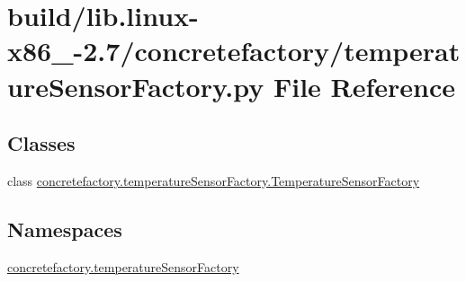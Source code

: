 \hypertarget{build_2lib_8linux-x86__64-2_87_2concretefactory_2temperatureSensorFactory_8py}{}\section{build/lib.linux-\/x86\+\_-\/2.7/concretefactory/temperature\+Sensor\+Factory.py File Reference}
\label{build_2lib_8linux-x86__64-2_87_2concretefactory_2temperatureSensorFactory_8py}
\subsection*{Classes}
\begin{DoxyCompactItemize}
\item 
class \hyperlink{classconcretefactory_1_1temperatureSensorFactory_1_1TemperatureSensorFactory}{concretefactory.\+temperature\+Sensor\+Factory.\+Temperature\+Sensor\+Factory}
\end{DoxyCompactItemize}
\subsection*{Namespaces}
\begin{DoxyCompactItemize}
\item 
 \hyperlink{namespaceconcretefactory_1_1temperatureSensorFactory}{concretefactory.\+temperature\+Sensor\+Factory}
\end{DoxyCompactItemize}
